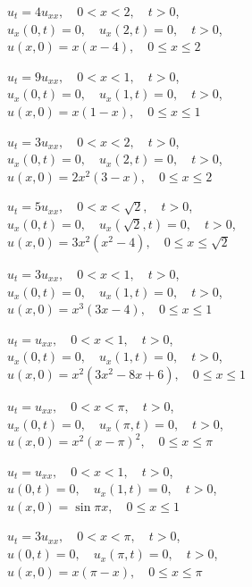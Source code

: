 \begin{exerciselist}
\item\label{exer:12.1.18}$u_t=4u_{xx},\quad 0<x<2,\quad t>0$,\\
$u_x(0,t)=0,\quad u_x(2,t)=0,\quad t>0$,\\
$u(x,0)=x(x-4),\quad 0\le x\le 2$

\item\label{exer:12.1.19}\Cex
$u_t=9u_{xx},\quad 0<x<1,\quad t>0$,\\
$u_x(0,t)=0,\quad u_x(1,t)=0,\quad t>0$,\\
$u(x,0)=x(1-x),\quad 0\le x\le 1$

\item\label{exer:12.1.20}$u_t=3u_{xx},\quad 0<x<2,\quad t>0$,\\
$u_x(0,t)=0,\quad u_x(2,t)=0,\quad t>0$,\\
$u(x,0)=2x^2(3-x),\quad 0\le x\le 2$

\item\label{exer:12.1.21}$u_t=5u_{xx},\quad 0<x<\sqrt2,\quad t>0$,\\
$u_x(0,t)=0,\quad u_x(\sqrt2,t)=0,\quad t>0$,\\
$u(x,0)=3x^2(x^2-4),\quad 0\le x\le \sqrt2$

\item\label{exer:12.1.22}\Cex
$u_t=3u_{xx},\quad 0<x<1,\quad t>0$,\\
$u_x(0,t)=0,\quad u_x(1,t)=0,\quad t>0$,\\
$u(x,0)=x^3(3x-4),\quad 0\le x\le 1$

\item\label{exer:12.1.23}$u_t=u_{xx},\quad 0<x<1,\quad t>0$,\\
$u_x(0,t)=0,\quad u_x(1,t)=0,\quad t>0$,\\
$u(x,0)=x^2(3x^2-8x+6),\quad 0\le x\le 1$

\item\label{exer:12.1.24}$u_t=u_{xx},\quad 0<x<\pi,\quad t>0$,\\
$u_x(0,t)=0,\quad u_x(\pi,t)=0,\quad t>0$,\\
$u(x,0)=x^2(x-\pi)^2,\quad 0\le x\le \pi$


\item\label{exer:12.1.25}$u_t=u_{xx},\quad 0<x<1,\quad t>0$,\\
$u(0,t)=0,\quad u_x(1,t)=0,\quad t>0$,\\
$u(x,0)=\sin\pi x,\quad 0\le x\le 1$

\item\label{exer:12.1.26}\Cex
$u_t=3u_{xx},\quad 0<x<\pi,\quad t>0$,\\
$u(0,t)=0,\quad u_x(\pi,t)=0,\quad t>0$,\\
$u(x,0)=x(\pi-x),\quad 0\le x\le \pi$


\end{exerciselist}

